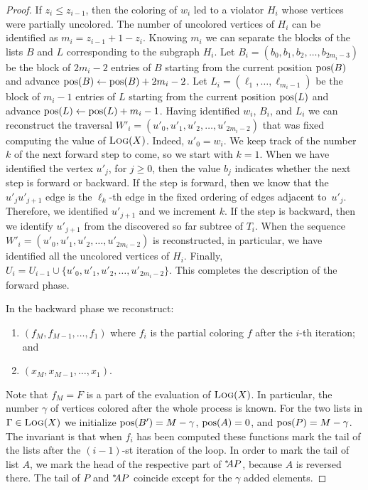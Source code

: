 \begin{proof}
  If $z_i \leq z_{i-1}$, then the coloring of $w_i$ led to a violator $H_i$
  whose vertices were partially uncolored. The number of uncolored vertices of $H_i$ 
  can be identified as $m_i=z_{i-1} +1 - z_i$. 
  Knowing $m_i$ we can separate the blocks 
  of the lists $B$ and $L$ corresponding to the subgraph $H_i$.
  Let $B_i=(b_0,b_1,b_2,\ldots,b_{2m_i-3})$ be the block of $2m_i-2$
  entries of $B$ starting from the current position $\text{\rmfamily pos}(B)$ and advance
  $\text{\rmfamily pos}(B) \gets \text{\rmfamily pos}(B)+2m_i-2$. 
  Let $L_i=(\ell_1,\ldots,\ell_{m_i-1})$ be the block of $m_i-1$ entries
  of $L$ starting from the current position $\text{\rmfamily pos}(L)$ and advance
  $\text{\rmfamily pos}(L) \gets \text{\rmfamily pos}(L)+m_i-1$. 
  Having identified $w_i$, $B_i$, and $L_i$ we can reconstruct 
  the traversal $W'_i=(u'_0,u'_1,u'_2,\ldots,u'_{2m_i-2})$ that was fixed 
  computing the value of $\text{\scshape Log}(X)$.
  Indeed, $u'_0=w_i$. We keep track of the number $k$ of the next forward step to come, so we start with $k=1$.
  When we have identified the vertex $u'_j$, for $j\geq0$, then the value
  $b_j$ indicates whether the next step is forward or backward. 
  If the step is forward, then we know that the $u'_ju'_{j+1}$ edge is 
  the $\ell_{k}$-th edge in the fixed ordering of edges adjacent to~$u'_j$.
  Therefore, we identified $u'_{j+1}$ and we increment $k$.
  If the step is backward, then we identify $u'_{j+1}$ 
  from the discovered so far subtree of $T_i$.
  When the sequence $W'_i=(u'_0,u'_1,u'_2,\ldots,u'_{2m_i-2})$ is reconstructed, 
  in particular, we have identified all the uncolored vertices of $H_i$.
  Finally, $U_i = U_{i-1} \cup \{u'_0,u'_1,u'_2,\ldots,u'_{2m_i-2}\}$.
  This completes the description of the forward phase.  
  
  In the backward phase we reconstruct:
  \begin{enumerate}[label=\textup{(\roman*)},nosep]
    \item $(f_M,f_{M-1},\ldots,f_1)$ where $f_i$ is the partial coloring $f$ 
    after the $i$-th iteration; and 
    \item $(x_M,x_{M-1},\ldots,x_1)$.
  \end{enumerate}
  Note that $f_M=F$ is a part of the evaluation of $\text{\scshape Log}(X)$.
  In particular, the number $\gamma$ of vertices colored after the whole process is known.
  For the two lists in $\Gamma \in \text{\scshape Log}(X)$
  we initialize $\text{\rmfamily pos}(B') = M-\gamma$, $\text{\rmfamily pos}(A)=0$, and
  $\text{\rmfamily pos}(P)=M  - \gamma$.
  The invariant is that
  when $f_i$ has been computed these functions mark the
  tail of the lists after the $(i-1)$-st iteration of the
  loop. In order to mark the tail of list $A$, we mark the head of the respective part of ${}^{*}\kern-3pt AP$, because $A$ is reversed there. The tail of $P$ and ${}^{*}\kern-3pt AP$ coincide except for the $\gamma$ added elements.


\end{proof}
